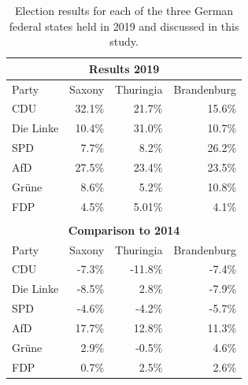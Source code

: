 \documentclass[sigchi, nonacm=true]{acmart}
\begin{document}
  \begin{table}[h]
    \centering

    \begin{tabular}{lrrr}
      
      \multicolumn{4}{c}{\textbf{Results 2019}} \\
      \toprule
      Party & Saxony & Thuringia & Brandenburg \\ 
      \midrule
      CDU & 32.1\% & 21.7\% & 15.6\% \\ 
      Die Linke & 10.4\% & 31.0\% & 10.7\% \\ 
      SPD & 7.7\% & 8.2\% & 26.2\% \\ 
      AfD & 27.5\% & 23.4\% & 23.5\% \\ 
      Gr\"une & 8.6\% & 5.2\% & 10.8\% \\ 
      FDP & 4.5\% & 5.01\% & 4.1\% \\ 
      \bottomrule\\
      
      \multicolumn{4}{c}{\textbf{Comparison to 2014}} \\
      \toprule
      Party & Saxony & Thuringia & Brandenburg \\ 
      \midrule
      CDU & -7.3\% & -11.8\% & -7.4\% \\ 
      Die Linke & -8.5\% &  2.8\% & -7.9\% \\ 
      SPD & -4.6\% & -4.2\% & -5.7\% \\ 
      AfD &  17.7\% &  12.8\% &  11.3\% \\ 
      Gr\"une &  2.9\% & -0.5\% &  4.6\% \\ 
      FDP &  0.7\% &  2.5\% &  2.6\% \\ 
      \bottomrule
    \end{tabular}

    \vspace{0.25cm}
    \caption{Election results for each of the three German federal states held in 2019 and discussed in this study. \cite{der_landeswahlleiter_fur_brandenburg_brandenburger_nodate, statistisches_landesamt_des_freistaates_sachsen_wahlergebnisse_nodate, thuringer_landesamt_fur_statistik_wahlen_nodate}}
    \label{tbl::electionres}
  \end{table}
\end{document}

